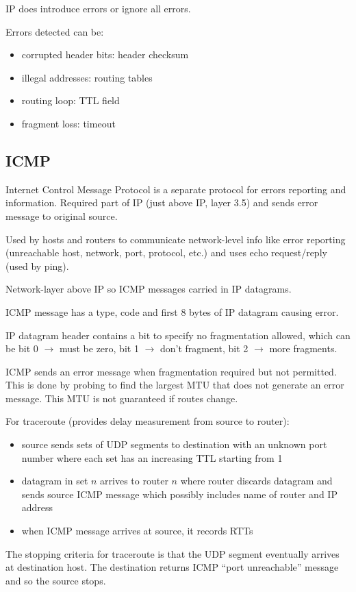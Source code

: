 \documentclass[11pt]{article}
\begin{document}
IP does introduce errors or ignore all errors.

Errors detected can be:
\begin{itemize}
\item corrupted header bits: header checksum
\item illegal addresses: routing tables
\item routing loop: TTL field
\item fragment loss: timeout
\end{itemize}
\subsection{ICMP}
\label{sec:org88dd0eb}
Internet Control Message Protocol is a separate protocol for errors reporting and
information.
Required part of IP (just above IP, layer 3.5) and sends error message to
original source.

Used by hosts and routers to communicate network-level info like error reporting
(unreachable host, network, port, protocol, etc.) and uses echo request/reply (used
by ping).

Network-layer above IP so ICMP messages carried in IP datagrams.

ICMP message has a type, code and first 8 bytes of IP datagram causing error.

IP datagram header contains a bit to specify no fragmentation allowed, which can be
bit 0 \(\to\) must be zero, bit 1 \(\to\) don't fragment, bit 2 \(\to\) more fragments.

ICMP sends an error message when fragmentation required but not permitted.
This is done by probing to find the largest MTU that does not generate an error
message.
This MTU is not guaranteed if routes change.

For traceroute (provides delay measurement from source to router):
\begin{itemize}
\item source sends sets of UDP segments to destination with an unknown port number
where each set has an increasing TTL starting from 1
\item datagram in set \(n\) arrives to router \(n\) where router discards datagram
and sends source ICMP message which possibly includes name of router
and IP address
\item when ICMP message arrives at source, it records RTTs
\end{itemize}

The stopping criteria for traceroute is that the UDP segment eventually arrives
at destination host.
The destination returns ICMP ``port unreachable'' message and so the source stops.
\end{document}
